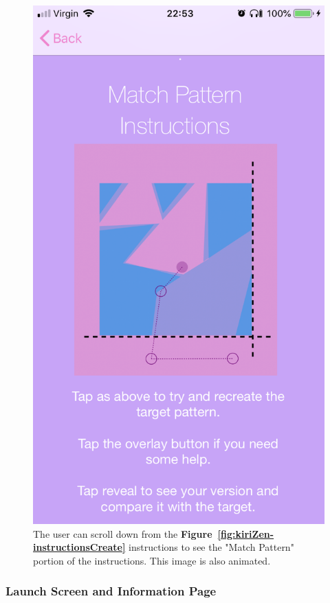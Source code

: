 \documentclass[11pt]{article}
\begin{document}
\begin{figure}[!ht]
\begin{minipage}{0.45\textwidth}
                                    \includegraphics[width=0.7\linewidth]{KiriZen/instructionsMatch.png}
                                    \caption{The user can scroll down from the  \textbf{Figure~\ref{fig:kiriZen-instructionsCreate}} instructions to see the "Match Pattern" portion of the instructions. This image is also animated.}
                                    \label{fig:kiriZen-instructionsMatch}
                                \end{minipage}
                            \end{figure}


                 \subsubsection{Launch Screen and Information Page}
\end{document}
